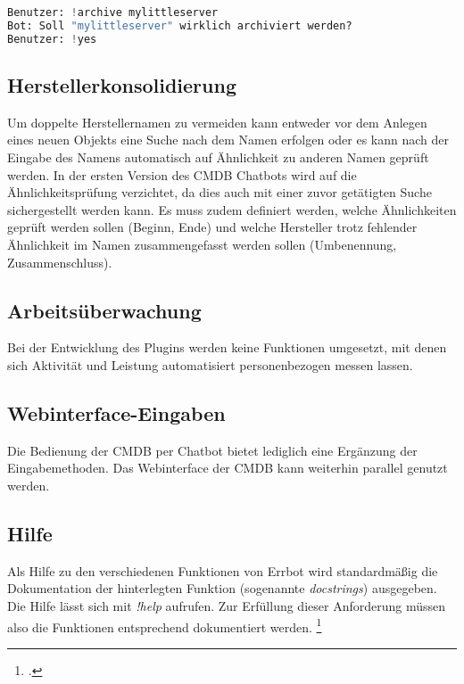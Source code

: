 \begin{lstlisting}[language=python, label=delconfirm, caption=Nachfrage bei der Archivierung von Objekten]
Benutzer: !archive mylittleserver
Bot: Soll "mylittleserver" wirklich archiviert werden?
Benutzer: !yes
\end{lstlisting}

\subsection{Herstellerkonsolidierung}
Um doppelte Herstellernamen zu vermeiden kann entweder vor dem Anlegen eines neuen Objekts eine Suche nach dem Namen erfolgen oder es kann nach der Eingabe des Namens automatisch auf Ähnlichkeit zu anderen Namen geprüft werden.
In der ersten Version des \acs{CMDB} Chatbots wird auf die Ähnlichkeitsprüfung verzichtet, da dies auch mit einer zuvor getätigten Suche sichergestellt werden kann. Es muss zudem definiert werden, welche Ähnlichkeiten geprüft werden sollen (Beginn, Ende) und welche Hersteller trotz fehlender Ähnlichkeit im Namen zusammengefasst werden sollen (Umbenennung, Zusammenschluss).

\subsection{Arbeitsüberwachung}
Bei der Entwicklung des Plugins werden keine Funktionen umgesetzt, mit denen sich Aktivität und Leistung automatisiert personenbezogen messen lassen. 

\subsection{Webinterface-Eingaben}
Die Bedienung der \acs{CMDB} per Chatbot bietet lediglich eine Ergänzung der Eingabemethoden. Das Webinterface der \acs{CMDB} kann weiterhin parallel genutzt werden.

\subsection{Hilfe}
Als Hilfe zu den verschiedenen Funktionen von Errbot wird standardmäßig die Dokumentation der hinterlegten Funktion (sogenannte \textit{docstrings}) ausgegeben. Die Hilfe lässt sich mit \textit{!help} aufrufen. Zur Erfüllung dieser Anforderung müssen also die Funktionen entsprechend dokumentiert werden.
\footcites[Vgl.][o. \pno]{errbot_2018_general}[Vgl.][o. \pno]{pep257}

